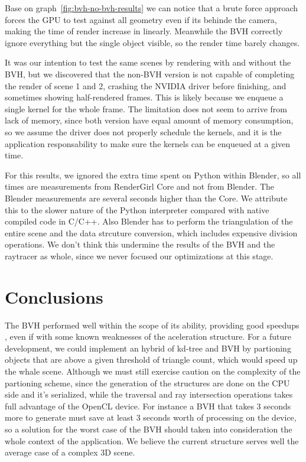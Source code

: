 \documentclass{vgtc}
\begin{document}
Base on graph~\ref{fig:bvh-no-bvh-results} we can notice that a brute
force approach forces the GPU to test against all geometry even if its
behinde the camera, making the time of render increase in
linearly. Meanwhile the BVH correctly ignore everything but the single
object visible, so the render time barely changes.

It was our intention to test the same scenes by rendering with and
without the BVH, but we discovered that the non-BVH version is not
capable of completing the render of scene 1 and 2, crashing the NVIDIA
driver before finishing, and sometimes showing half-rendered
frames. This is likely because we enqueue a single kernel for the
whole frame. The limitation does not seem to arrive from lack of
memory, since both version have equal amount of memory consumption, so
we assume the driver does not properly schedule the kernels, and it is
the application responsability to make sure the kernels can be
enqueued at a given time.

For this results, we ignored the extra time spent on Python within
Blender, so all times are measurements from RenderGirl Core and not
from Blender. The Blender measurements are several seconds higher than
the Core. We attribute this to the slower nature of the Python
interpreter compared with native compiled code in C/C++. Also Blender
has to perform the triangulation of the entire scene and the data
strcuture conversion, which includes expensive division operations. We
don't think this undermine the results of the BVH and the raytracer as
whole, since we never focused our optimizations at this stage.

\section{Conclusions}
\label{sec:conclusion}

The BVH performed well within the scope of its ability, providing good
speedups , even if with some known weaknesses of the aceleration
structure. For a future development, we could implement an hybrid of
kd-tree and BVH by partioning objects that are above a given threshold
of triangle count, which would speed up the whale scene. Although we
must still exercise caution on the complexity of the partioning
scheme, since the generation of the structures are done on the CPU
side and it's serialized, while the traversal and ray intersection
operations takes full advantage of the OpenCL device. For instance a
BVH that takes 3 seconds more to generate must save at least 3 seconds
worth of processing on the device, so a solution for the worst case of
the BVH should taken into consideration the whole context of the
application. We believe the current structure serves well the average
case of a complex 3D scene.
\end{document}
